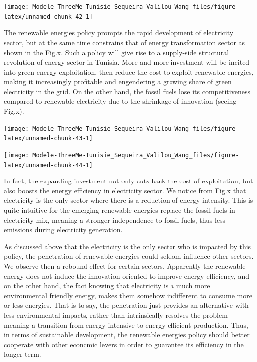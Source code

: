 \documentclass[
]{article}
\begin{document}
\begin{center}\texttt{[image: Modele-ThreeMe-Tunisie\_Sequeira\_Valilou\_Wang\_files/figure-latex/unnamed-chunk-42-1]} \end{center}

The renewable energies policy prompts the rapid development of
electricity sector, but at the same time constrains that of energy
transformation sector as shown in the Fig.x. Such a policy will give
rise to a supply-side structural revolution of energy sector in Tunisia.
More and more investment will be incited into green energy exploitation,
then reduce the cost to exploit renewable energies, making it
increasingly profitable and engendering a growing share of green
electricity in the grid. On the other hand, the fossil fuels lose its
competitiveness compared to renewable electricity due to the shrinkage
of innovation (seeing Fig.x).

\begin{center}\texttt{[image: Modele-ThreeMe-Tunisie\_Sequeira\_Valilou\_Wang\_files/figure-latex/unnamed-chunk-43-1]} \end{center}

\begin{center}\texttt{[image: Modele-ThreeMe-Tunisie\_Sequeira\_Valilou\_Wang\_files/figure-latex/unnamed-chunk-44-1]} \end{center}

In fact, the expanding investment not only cuts back the cost of
exploitation, but also boosts the energy efficiency in electricity
sector. We notice from Fig.x that electricity is the only sector where
there is a reduction of energy intensity. This is quite intuitive for
the emerging renewable energies replace the fossil fuels in electricity
mix, meaning a stronger independence to fossil fuels, thus less
emissions during electricity generation.

As discussed above that the electricity is the only sector who is
impacted by this policy, the penetration of renewable energies could
seldom influence other sectors. We observe then a rebound effect for
certain sectors. Apparently the renewable energy does not induce the
innovation oriented to improve energy efficiency, and on the other hand,
the fact knowing that electricity is a much more environmental friendly
energy, makes them somehow indifferent to consume more or less energies.
That is to say, the penetration just provides an alternative with less
environmental impacts, rather than intrinsically resolves the problem
meaning a transition from energy-intensive to energy-efficient
production. Thus, in terms of sustainable development, the renewable
energies policy should better cooperate with other economic levers in
order to guarantee its efficiency in the longer term.
\end{document}

